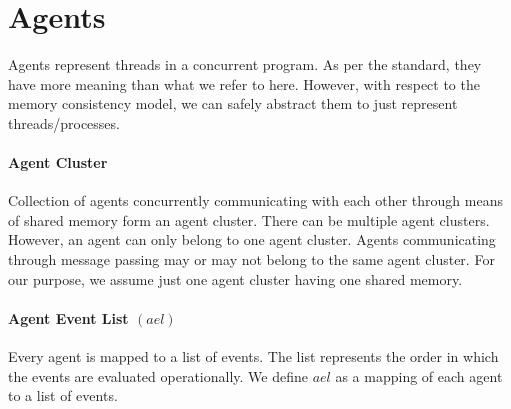 \section{Agents}

    Agents represent threads in a concurrent program. As per the standard, they have more meaning \cite{ECMA} than what we refer to here. 
    However, with respect to the memory consistency model, we can safely abstract them to just represent threads/processes.

    \paragraph{Agent Cluster}
        Collection of agents concurrently communicating with each other through means of shared memory form an agent cluster.  
        There can be multiple agent clusters. 
        However, an agent can only belong to one agent cluster. 
        Agents communicating through message passing may or may not belong to the same agent cluster. 
        For our purpose, we assume just one agent cluster having one shared memory. 

    \paragraph{Agent Event List $(ael)$}
        Every agent is mapped to a list of events. The list represents the order in which the events are evaluated operationally\footnotemark. 
        We define $ael$ as a mapping of each agent to a list of events.
        

        

            

